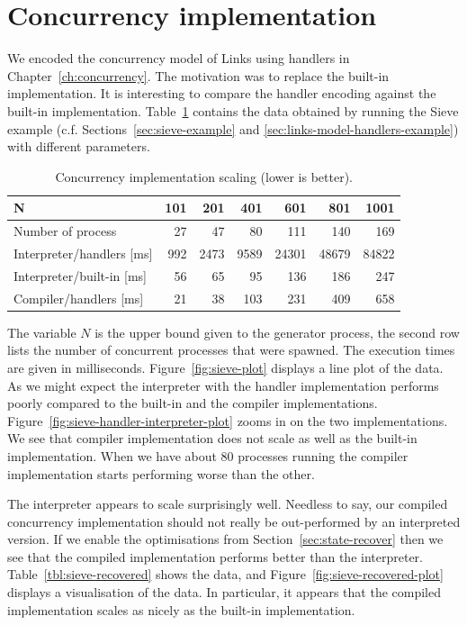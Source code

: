 \documentclass[12pt,mscres,cdtppar,twoside,openright,logo,rightchapter,normalheadings]{infthesis}
\theoremstyle{definition}
\begin{document}
\section{Concurrency implementation}
\label{sec:concur-label}

We encoded the concurrency model of Links using handlers in
Chapter~\ref{ch:concurrency}. The motivation was to replace the
built-in implementation. It is interesting to compare the handler
encoding against the built-in implementation. Table~\ref{tbl:sieve}
contains the data obtained by running the Sieve example
(c.f. Sections~\ref{sec:sieve-example} and
\ref{sec:links-model-handlers-example}) with different parameters. 
\begin{table}
\centering
\begin{tabular}{| l | r | r | r | r | r | r |}
\hline
N  & 101 & 201 & 401 & 601 & 801 & 1001\\
\hline
Number of process & 27 & 47 & 80 & 111 & 140 & 169\\
\hline
\hline
  Interpreter/handlers [ms] & 992  & 2473 & 9589 & 24301  & 48679  & 84822\\
\hline
  Interpreter/built-in [ms] & 56 & 65 & 95 & 136 & 186 & 247\\
\hline
  Compiler/handlers    [ms] & 21 & 38 & 103 & 231  & 409  & 658\\
\hline
\end{tabular}
\caption{Concurrency implementation scaling (lower is better).}\label{tbl:sieve}
\end{table}
The variable $N$ is the upper bound given to the generator process,
the second row lists the number of concurrent processes that were
spawned. The execution times are given in
milliseconds. Figure~\ref{fig:sieve-plot} displays a line plot of the
data. As we might expect the interpreter with the handler
implementation performs poorly compared to the built-in and the
compiler
implementations. Figure~\ref{fig:sieve-handler-interpreter-plot} zooms
in on the two implementations. We see that compiler implementation
does not scale as well as the built-in implementation. When we have
about 80 processes running the compiler implementation starts
performing worse than the other.

The interpreter appears to scale surprisingly well. Needless to say,
our compiled concurrency implementation should not really be
out-performed by an interpreted version. If we enable the
optimisations from Section~\ref{sec:state-recover} then we see that
the compiled implementation performs better than the
interpreter. Table~\ref{tbl:sieve-recovered} shows the data, and
Figure~\ref{fig:sieve-recovered-plot} displays a visualisation of the
data. In particular, it appears that the compiled implementation
scales as nicely as the built-in implementation.
\end{document}
